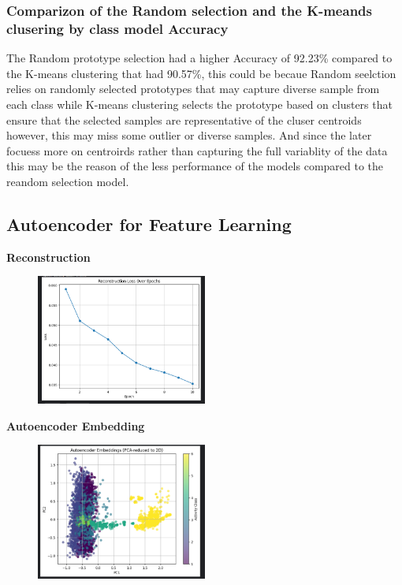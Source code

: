 \documentclass{article}
\begin{document}
\subsubsection*{Comparizon of the Random selection and the K-meands clusering by class model Accuracy}
The Random prototype selection had a higher Accuracy of 92.23\% compared to the K-means clustering that had 90.57\%, this could be becaue Random seelction relies on randomly selected prototypes that
may capture diverse sample from each class while K-means clustering selects the prototype based on clusters that ensure that the selected samples are representative of the cluser centroids 
however, this may miss some outlier or diverse samples. And since the later focuess more on centroirds rather than capturing the full variablity of the data this may be the reason of the less performance of the models
compared to the reandom selection model.

\subsection{Autoencoder for Feature Learning}
\textbf{Reconstruction}
\begin{figure}[H]
    \centering
    \includegraphics[width=0.5\textwidth]{Reconstruction.png}
    \label{fig:reconstruction}
\end{figure}

\clearpage
\textbf{Autoencoder Embedding} 
\begin{figure}[H]
    \centering
    \includegraphics[width=0.5\textwidth]{Autoencoder.png}
    \label{fig:autoencoder_embedding}
\end{figure}
\end{document}

